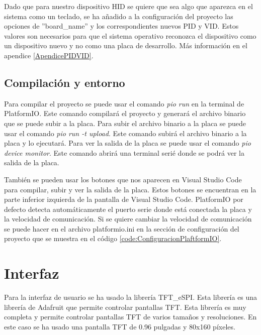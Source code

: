 \begin{tcolorbox}[colback=blue!5!white, colframe=blue!55!white, title=Nota]
    Dado que para nuestro dispositivo \gls{HID} se quiere que sea algo que aparezca en el sistema como un teclado, se ha añadido a la configuración del proyecto las opciones de ''board\_name'' y los correspondientes nuevos \gls{PID} y \gls{VID}. Estos valores son necesarios para que el sistema operativo reconozca el dispositivo como un dispositivo nuevo y no como una placa de desarrollo. Más información en el apendice \ref{ApendicePIDVID}.
\end{tcolorbox}

\subsection{Compilación y entorno}

Para compilar el proyecto se puede usar el comando \textit{pio run} en la terminal de \gls{PlatformIO}. Este comando compilará el proyecto y generará el archivo binario que se puede subir a la placa. Para subir el archivo binario a la placa se puede usar el comando \textit{pio run -t upload}. Este comando subirá el archivo binario a la placa y lo ejecutará. Para ver la salida de la placa se puede usar el comando \textit{pio device monitor}. Este comando abrirá una terminal serié donde se podrá ver la salida de la placa.

También se pueden usar los botones que nos aparecen en Visual Studio Code para compilar, subir y ver la salida de la placa. Estos botones se encuentran en la parte inferior izquierda de la pantalla de Visual Studio Code. \gls{PlatformIO} por defecto detecta automáticamente el puerto serie donde está conectada la placa y la velocidad de comunicación. Si se quiere cambiar la velocidad de comunicación se puede hacer en el archivo platformio.ini en la sección de configuración del proyecto que se muestra en el código \ref{code:ConfiguracionPlaftformIO}.


\section{Interfaz}

Para la interfaz de usuario se ha usado la librería TFT\_eSPI. Esta librería es una librería de Adafruit que permite controlar pantallas \gls{TFT}. Esta librería es muy completa y permite controlar pantallas \gls{TFT} de varios tamaños y resoluciones. En este caso se ha usado una pantalla \gls{TFT} de 0.96 pulgadas y 80x160 píxeles.

